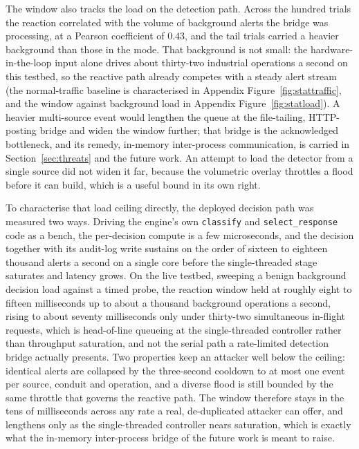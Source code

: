 The window also tracks the load on the detection path. Across the hundred trials the reaction correlated with the volume of background alerts the bridge was processing, at a Pearson coefficient of $0.43$, and the tail trials carried a heavier background than those in the mode. That background is not small: the hardware-in-the-loop input alone drives about thirty-two industrial operations a second on this testbed, so the reactive path already competes with a steady alert stream (the normal-traffic baseline is characterised in Appendix Figure~\ref{fig:stattraffic}, and the window against background load in Appendix Figure~\ref{fig:statload}). A heavier multi-source event would lengthen the queue at the file-tailing, HTTP-posting bridge and widen the window further; that bridge is the acknowledged bottleneck, and its remedy, in-memory inter-process communication, is carried in Section~\ref{sec:threats} and the future work. An attempt to load the detector from a single source did not widen it far, because the volumetric overlay throttles a flood before it can build, which is a useful bound in its own right.

To characterise that load ceiling directly, the deployed decision path was measured two ways. Driving the engine's own \texttt{classify} and \texttt{select\_response} code as a bench, the per-decision compute is a few microseconds, and the decision together with its audit-log write sustains on the order of sixteen to eighteen thousand alerts a second on a single core before the single-threaded stage saturates and latency grows. On the live testbed, sweeping a benign background decision load against a timed probe, the reaction window held at roughly eight to fifteen milliseconds up to about a thousand background operations a second, rising to about seventy milliseconds only under thirty-two simultaneous in-flight requests, which is head-of-line queueing at the single-threaded controller rather than throughput saturation, and not the serial path a rate-limited detection bridge actually presents. Two properties keep an attacker well below the ceiling: identical alerts are collapsed by the three-second cooldown to at most one event per source, conduit and operation, and a diverse flood is still bounded by the same throttle that governs the reactive path. The window therefore stays in the tens of milliseconds across any rate a real, de-duplicated attacker can offer, and lengthens only as the single-threaded controller nears saturation, which is exactly what the in-memory inter-process bridge of the future work is meant to raise.

